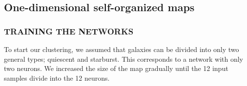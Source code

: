     \subsection{One-dimensional self-organized maps}
    \label{sec: 1D}
        \subsubsection{TRAINING THE NETWORKS} %
        \label{sec: 1Dt}
            To start our clustering, we assumed that galaxies can be divided into only two general types; quiescent and starburst.
            This corresponds to a network with only two neurons.
            We increased the size of the map gradually until the 12 input samples divide into the 12 neurons. 
        
